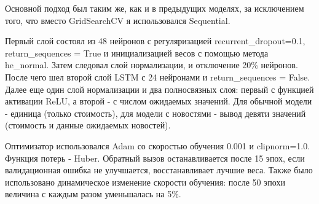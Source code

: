 \documentclass[12pt, a4paper]{article}
\begin{document}
Основной подход был таким же, как и в предыдущих моделях, за исключением того, что вместо GridSearchCV я использовался Sequential.

Первый слой состоял из 48 нейронов с регуляризацией recurrent\_dropout=0.1,\\return\_sequences = True и инициализацией весов с помощью метода he\_normal. Затем следовал слой нормализации, и отключение 20\% нейронов. После чего шел второй слой LSTM с 24 нейронами и return\_sequences = False. Далее еще один слой нормализации и два полносвязных слоя: первый с функцией активации ReLU, а второй - с числом ожидаемых значений. Для обычной модели - единица (только стоимость), для модели с новостями - вывод девяти значений (стоимость и данные ожидаемых новостей).

Оптимизатор использовался Adam со скоростью обучения 0.001 и clipnorm=1.0. Функция потерь - Huber. Обратный вызов останавливается после 15 эпох, если валидационная ошибка не улучшается, восстанавливает лучшие веса. Также было использовано динамическое изменение скорости обучения: после 50 эпохи величина с каждым разом уменьшалась на 5\%.
\end{document}

